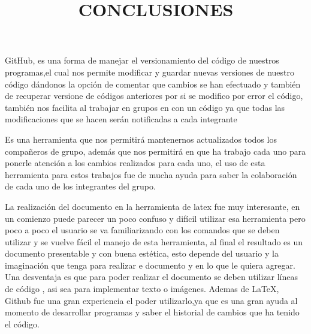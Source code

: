\documentclass[12pt]{extbook}
\begin{document}
GitHub, es una forma de manejar el versionamiento del código de nuestros programas,el cual nos permite modificar y guardar nuevas versiones de nuestro código dándonos la opción de comentar que cambios se han efectuado y también de recuperar versione de códigos anteriores por si se modifico por error el código, también nos facilita al trabajar en grupos en con un código ya que todas las modificaciones que se hacen serán notificadas a cada integrante

Es una herramienta que nos permitirá mantenernos actualizados todos los compañeros de grupo, además que nos permitirá en que ha trabajo cada uno para ponerle atención a los cambios realizados para cada uno, el uso de esta herramienta para estos trabajos fue de mucha ayuda para saber la colaboración de cada uno de los integrantes del grupo.



\begin{center}
\title{CONCLUSIONES}\maketitle
\end{center}


La realización del documento en la herramienta de latex fue muy interesante, en un comienzo puede parecer un poco confuso y difícil utilizar esa herramienta pero poco a poco el usuario se va familiarizando con los comandos que se deben utilizar y se vuelve fácil el manejo de esta herramienta, al final el resultado es un documento  presentable y con buena estética, esto depende del usuario y la imaginación que tenga para realizar e  documento y en lo que le quiera agregar.
Una desventaja es que para poder realizar el documento se deben utilizar líneas de código , asi sea para implementar texto o imágenes.
Ademas de \LaTeX,  Github fue una gran experiencia 	el poder utilizarlo,ya que es una gran ayuda al momento de desarrollar programas y saber el historial de cambios que ha tenido el código.
\end{document}
